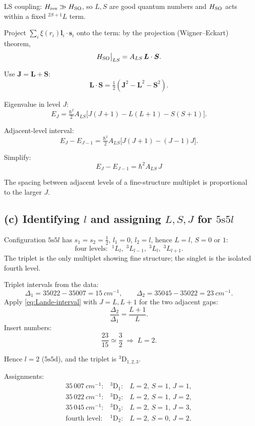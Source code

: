 \documentclass[11pt]{article}
\begin{document}
LS coupling: $H_{\rm res}\gg H_{\rm SO}$, so $L,S$ are good quantum numbers and $H_{\rm SO}$ acts within a fixed $^{2S+1}\!L$ term.

Project $\sum_i\xi(r_i)\bm l_i\cdot\bm s_i$ onto the term: by the projection (Wigner--Eckart) theorem,
\begin{equation}
H_{\rm SO}\big|_{LS}=A_{LS}\,\bm L\cdot\bm S.
\label{eq:HSO-LS}
\end{equation}

Use $\bm J=\bm L+\bm S$:
\[
\bm L\cdot\bm S=\tfrac12(\bm J^{2}-\bm L^{2}-\bm S^{2}).
\]

Eigenvalue in level $J$:
\[
E_{J}=\tfrac{\hbar^{2}}{2}A_{LS}\bigl[J(J+1)-L(L+1)-S(S+1)\bigr].
\]

Adjacent-level interval:
\[
E_{J}-E_{J-1}=\tfrac{\hbar^{2}}{2}A_{LS}\bigl[J(J+1)-(J-1)J\bigr].
\]

Simplify:
\begin{equation}
\boxed{\;E_{J}-E_{J-1}=\hbar^{2}A_{LS}\,J\;}
\label{eq:Lande-interval}
\end{equation}

The spacing between adjacent levels of a fine-structure multiplet is proportional to the larger $J$.

\subsection*{(c) Identifying $l$ and assigning $L,S,J$ for $5\mathrm{s}5l$}

Configuration $5\mathrm{s}5l$ has $s_{1}=s_{2}=\tfrac12$, $l_{1}=0$, $l_{2}=l$, hence $L=l$, $S=0$ or $1$:
\[
\text{four levels: }\;{}^{1}\!L_{l},\;{}^{3}\!L_{l-1},\;{}^{3}\!L_{l},\;{}^{3}\!L_{l+1}.
\]
The triplet is the only multiplet showing fine structure; the singlet is the isolated fourth level.

Triplet intervals from the data:
\[
\Delta_{1}=35022-35007=15\ \si{cm^{-1}},\qquad \Delta_{2}=35045-35022=23\ \si{cm^{-1}}.
\]
Apply \eqref{eq:Lande-interval} with $J=L,L+1$ for the two adjacent gaps:
\[
\frac{\Delta_{2}}{\Delta_{1}}=\frac{L+1}{L}.
\]
Insert numbers:
\[
\frac{23}{15}\simeq\frac{3}{2}\;\Rightarrow\;L=2.
\]

Hence $l=2$ ($5\mathrm{s}5\mathrm{d}$), and the triplet is ${}^{3}\!\mathrm{D}_{1,2,3}$.

Assignments:
\[
\boxed{\;
\begin{array}{lll}
35\,007\ \si{cm^{-1}}: &{}^{3}\mathrm{D}_{1}: & L=2,\,S=1,\,J=1,\\[2pt]
35\,022\ \si{cm^{-1}}: &{}^{3}\mathrm{D}_{2}: & L=2,\,S=1,\,J=2,\\[2pt]
35\,045\ \si{cm^{-1}}: &{}^{3}\mathrm{D}_{3}: & L=2,\,S=1,\,J=3,\\[2pt]
\text{fourth level}: &{}^{1}\mathrm{D}_{2}: & L=2,\,S=0,\,J=2.
\end{array}\;}
\]
\end{document}
